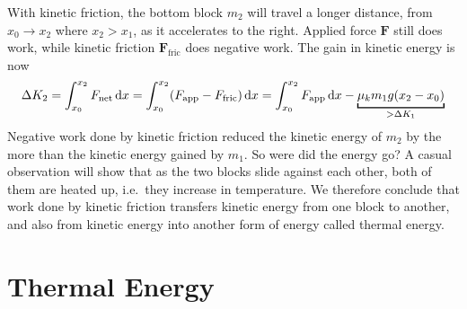 With kinetic friction, the bottom block $m_2$ will travel a longer distance,
from $x_0\to x_2$ where $x_2>x_1$, as it accelerates to the right.
Applied force $\bm F$ still does work, while kinetic friction
$\bm F_\text{fric}$ does negative work. The gain in kinetic energy is now
\begin{equation*}
  \Delta K_2 = \int_{x_0}^{x_2} F_\text{net}\dl x =
  \int_{x_0}^{x_2} (F_\text{app}-F_\text{fric})\dl x =
  \int_{x_0}^{x_2} F_\text{app}\dl x -
  \underbracket[1pt]{\mu_km_1g(x_2-x_0)}_{>\Delta K_1}
\end{equation*}
Negative work done by kinetic friction reduced the kinetic energy of $m_2$ by
the more than the kinetic energy gained by $m_1$. So were did the energy go?
A casual observation will show that as the two blocks slide against each other,
both of them are heated up, i.e.\ they increase in temperature. We therefore
conclude that work done by kinetic friction transfers kinetic energy from
one block to another, and also from kinetic energy into another form of
energy called thermal energy.



\section{Thermal Energy}

